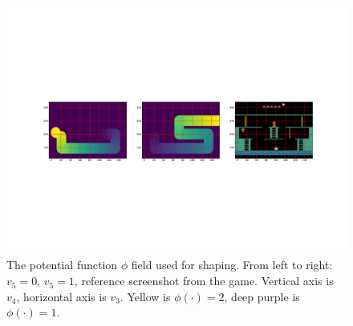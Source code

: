 {\begin{figure}[hbtp]
\begin{center}
\includegraphics[width=\textwidth]{img/shaping.pdf}
\end{center}
\caption[The potential function $\phi$ field used for shaping]{The potential
  function $\phi$ field used for shaping. From left to right: $v_5=0$, $v_5=1$,
  reference screenshot from the game. Vertical axis is $v_4$, horizontal axis
  is $v_3$. Yellow is $\phi(\cdot)=2$, deep purple is $\phi(\cdot)=1$.\label{fig:shaping}}
\end{figure}
}


